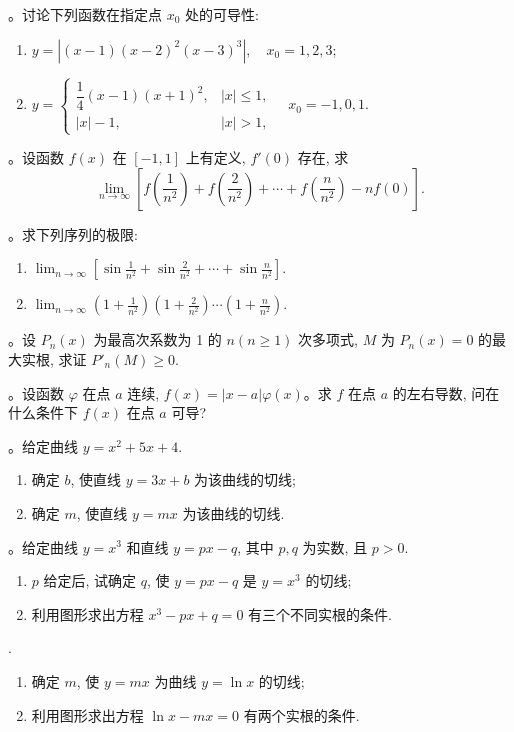 。讨论下列函数在指定点 $x_0$ 处的可导性:
\begin{enumerate}
  \item $y=|(x-1)(x-2)^2(x-3)^3|,\quad x_0=1,2,3$;
  \item
  $
  y=
  \begin{cases}
    \dfrac14(x-1)(x+1)^2, & |x|\leqslant1,\\
    |x|-1, & |x|>1,
  \end{cases}
  \quad x_0=-1,0,1.
  $
\end{enumerate}

。设函数 $f(x)$ 在 $[-1,1]$ 上有定义, $f'(0)$ 存在, 求
\[
  \lim_{n\to\infty}
  \left[
    f\left(\frac1{n^2}\right)
    +
    f\left(\frac2{n^2}\right)
    +\cdots+
    f\left(\frac n{n^2}\right)
    -
    nf(0)
  \right].
\]

。求下列序列的极限:
\begin{enumerate}
  \item
  $\displaystyle
  \lim_{n\to\infty}
  \left[
    \sin\frac1{n^2}+\sin\frac2{n^2}+\cdots+\sin\frac n{n^2}
  \right].
  $
  \item
  $\displaystyle
  \lim_{n\to\infty}
  \left(1+\frac1{n^2}\right)
  \left(1+\frac2{n^2}\right)\cdots
  \left(1+\frac n{n^2}\right).
  $
\end{enumerate}

。设 $P_n(x)$ 为最高次系数为 1 的 $n(n\geqslant1)$ 次多项式, $M$ 为 $P_n(x)=0$ 的最大实根, 求证 $P'_n(M)\geqslant0$.

。设函数 $\varphi$ 在点 $a$ 连续, $f(x)=|x-a|\varphi(x)$。求 $f$ 在点 $a$ 的左右导数, 问在什么条件下 $f(x)$ 在点 $a$ 可导?

。给定曲线 $y=x^2+5x+4$.
\begin{enumerate}
  \item 确定 $b$, 使直线 $y=3x+b$ 为该曲线的切线;
  \item 确定 $m$, 使直线 $y=mx$ 为该曲线的切线.
\end{enumerate}

。给定曲线 $y=x^3$ 和直线 $y=px-q$, 其中 $p,q$ 为实数, 且 $p>0$.
\begin{enumerate}
  \item $p$ 给定后, 试确定 $q$, 使 $y=px-q$ 是 $y=x^3$ 的切线;
  \item 利用图形求出方程 $x^3-px+q=0$ 有三个不同实根的条件.
\end{enumerate}

.
\begin{enumerate}
  \item 确定 $m$, 使 $y=mx$ 为曲线 $y=\ln x$ 的切线;
  \item 利用图形求出方程 $\ln x-mx=0$ 有两个实根的条件.
\end{enumerate}

